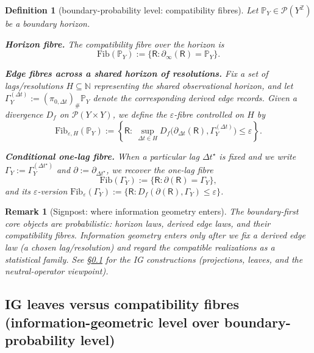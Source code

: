 \documentclass[11pt]{article}
\newtheorem{definition}{Definition}
\newtheorem{remark}{Remark}
\newcommand{\Pcal}{\mathcal{P}}
\newcommand{\Fib}{\mathrm{Fib}} %
\begin{document}
\begin{definition}[boundary-probability level: compatibility fibres]
\label{def:compatibility-fibre}
Let $\mathbb P_Y\in\Pcal(Y^{\mathbb Z})$ be a boundary horizon.

\smallskip
\noindent\textbf{Horizon fibre.} The \emph{compatibility fibre over the horizon} is
\[
\Fib(\mathbb P_Y) := \{\mathsf R : \partial_\infty(\mathsf R)=\mathbb P_Y\}.
\]

\smallskip
\noindent\textbf{Edge fibres across a shared horizon of resolutions.}
Fix a set of lags/resolutions $H\subseteq\mathbb N$ representing the \emph{shared observational horizon}, and let
$\Gamma_Y^{(\Delta t)}:=(\pi_{0,\Delta t})_\#\mathbb P_Y$ denote the corresponding derived edge records.
Given a divergence $D_f$ on $\Pcal(Y\times Y)$, we define the $\varepsilon$-fibre controlled on $H$ by
\[
\Fib_{\varepsilon,H}(\mathbb P_Y)
:=
\left\{\mathsf R:\ \sup_{\Delta t\in H} D_f\!\bigl(\partial_{\Delta t}(\mathsf R),\Gamma_Y^{(\Delta t)}\bigr)\le \varepsilon \right\}.
\]

\smallskip
\noindent\textbf{Conditional one-lag fibre.} When a particular lag $\Delta t^\star$ is fixed and we write $\Gamma_Y:=\Gamma_Y^{(\Delta t^\star)}$ and $\partial:=\partial_{\Delta t^\star}$, we recover the one-lag fibre
\[
\Fib(\Gamma_Y) := \{\mathsf R : \partial(\mathsf R)=\Gamma_Y\},
\]
and its $\varepsilon$-version $\Fib_\varepsilon(\Gamma_Y):=\{\mathsf R: D_f(\partial(\mathsf R),\Gamma_Y)\le \varepsilon\}$.
\end{definition}




\begin{remark}[Signpost: where information geometry enters]\label{rem:signpost-ig}
The boundary-first core objects are \emph{probabilistic}: horizon laws, derived edge laws, and their compatibility fibres.
Information geometry enters only after we fix a derived edge law (a chosen lag/resolution) and regard the compatible realizations as a statistical family.
See \S\ref{sec:ig-notions} for the IG constructions (projections, leaves, and the neutral-operator viewpoint).
\end{remark}



\subsection{IG leaves versus compatibility fibres (information-geometric level over boundary-probability level)}
\label{sec:ig-notions}
\end{document}

